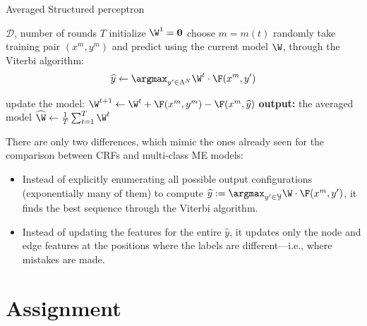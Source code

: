 \begin{algorithm}[h!]
   \caption{Averaged Structured perceptron \label{alg:structured-perceptron}}
\begin{algorithmic}[1]
    $\mathcal{D}$, number of rounds $T$
   \STATE initialize $\W^1 = \mathbf{0}$
	\STATE choose $m=m(t)$ randomly
	\STATE take training pair $(x^m, y^m)$ and 
predict using the current model $\W$, through the Viterbi algorithm: 
	$$\widehat{y}  \leftarrow \argmax_{y' \in \Lambda^N} \W^t \cdot \F(x^m,y')$$	

	\STATE update the model: 
	$\W^{t+1} \leftarrow \W^{t} + \F(x^m,y^m) - \F(x^m,\widehat{y})$
	\ENDFOR
   \STATE \textbf{output:} the averaged model $\widehat{\W} \leftarrow \frac{1}{T}\sum_{t=1}^T \W^t$
\end{algorithmic}
\end{algorithm}



There are only two differences, which mimic the ones already seen for the comparison between CRFs 
and multi-class ME models:
\begin{itemize}
\item Instead of explicitly enumerating all possible output 
configurations (exponentially many of them) to compute 
 $\widehat{y} := \argmax_{y'\in\mathcal{Y}} \W \cdot \F(x^m,y')$, 
it finds the best sequence through the Viterbi algorithm. 
\item Instead of updating the features for the entire $\widehat{y}$, 
it updates only the node and edge features at the positions where the
  labels are different---i.e., where mistakes are made.
\end{itemize}



\section{Assignment}

